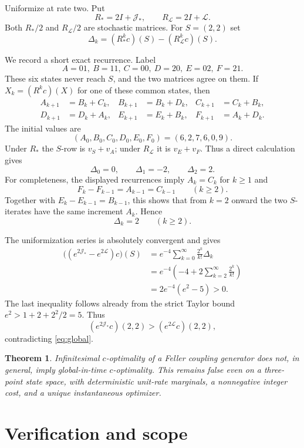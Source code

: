 \documentclass[11pt]{article}
\newtheorem{theorem}{Theorem}
\begin{document}
Uniformize at rate two.  Put
\[
 R_*=2I+\mathcal J_*,\qquad R_{\mathcal L}=2I+\mathcal L.
\]
Both $R_*/2$ and $R_{\mathcal L}/2$ are stochastic matrices.  For
$S=(2,2)$ set
\[
 \Delta_k=(R_*^k c)(S)-(R_{\mathcal L}^k c)(S).
\]

We record a short exact recurrence.  Label
\[
 A=01,\ B=11,\ C=00,\ D=20,\ E=02,\ F=21.
\]
These six states never reach $S$, and the two matrices agree on them.  If
$X_k=(R^kc)(X)$ for one of these common states, then
\begin{align*}
 A_{k+1}&=B_k+C_k,& B_{k+1}&=B_k+D_k,&
 C_{k+1}&=C_k+B_k,\\
 D_{k+1}&=D_k+A_k,& E_{k+1}&=E_k+B_k,&
 F_{k+1}&=A_k+D_k.
\end{align*}
The initial values are
\[
 (A_0,B_0,C_0,D_0,E_0,F_0)=(6,2,7,6,0,9).
\]
Under $R_*$ the $S$-row is $v_S+v_A$; under $R_{\mathcal L}$ it is
$v_E+v_F$.  Thus a direct calculation gives
\[
 \Delta_0=0,\qquad \Delta_1=-2,\qquad \Delta_2=2.
\]
For completeness, the displayed recurrences imply $A_k=C_k$ for $k\ge1$ and
\[
 F_k-F_{k-1}=A_{k-1}=C_{k-1}\qquad(k\ge2).
\]
Together with $E_k-E_{k-1}=B_{k-1}$, this shows that from $k=2$ onward the
two $S$-iterates have the same increment $A_k$.  Hence
\begin{equation}\label{eq:deltas}
 \Delta_k=2\qquad(k\ge2).
\end{equation}

The uniformization series is absolutely convergent and gives
\begin{align*}
 \bigl((e^{2\mathcal J_*}-e^{2\mathcal L})c\bigr)(S)
 &=e^{-4}\sum_{k=0}^{\infty}\frac{2^k}{k!}\Delta_k\\
 &=e^{-4}\left(-4+2\sum_{k=2}^{\infty}\frac{2^k}{k!}\right)\\
 &=2e^{-4}(e^2-5)>0.
\end{align*}
The last inequality follows already from the strict Taylor bound
$e^2>1+2+2^2/2=5$.  Thus
\[
 (e^{2\mathcal J_*}c)(2,2)>(e^{2\mathcal L}c)(2,2),
\]
contradicting \eqref{eq:global}.

\begin{theorem}
Infinitesimal $c$-optimality of a Feller coupling generator does not, in
general, imply global-in-time $c$-optimality.  This remains false even on a
three-point state space, with deterministic unit-rate marginals, a
nonnegative integer cost, and a unique instantaneous optimizer.
\end{theorem}

\section{Verification and scope}
\end{document}
